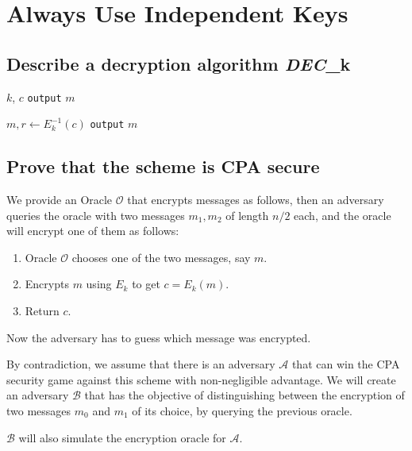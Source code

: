 \documentclass{article}
\begin{document}
\section{Always Use Independent Keys}
\subsection{Describe a decryption algorithm \textit{DEC}_k}

\begin{algorithm}
\caption{Decryption algorithm \textit{DEC}_k}
\begin{algorithmic}[H]
\Require $k$, $c$
\Ensure \texttt{output} $m$

\State $m, r \gets E_k^{-1}(c)$
\State \texttt{output} $m$
\end{algorithmic}
\end{algorithm}


\subsection{Prove that the scheme is CPA secure}
We provide an Oracle $\mathcal{O}$ that encrypts messages as follows, then an adversary queries the oracle with two messages $m_1, m_2$ of length $n/2$ each, and the oracle will encrypt one of them as follows:
\begin{enumerate}
    \item Oracle $\mathcal{O}$ chooses one of the two messages, say $m$.
    \item Encrypts $m$ using $E_k$ to get $c = E_k(m)$.
    \item Return $c$.
\end{enumerate}
Now the adversary has to guess which message was encrypted.

By contradiction, we assume that there is an adversary $\mathcal{A}$ that can win the CPA security game against this scheme with non-negligible advantage.
We will create an adversary $\mathcal{B}$ that has the objective of distinguishing between the encryption of two messages $m_0$ and $m_1$ of its choice, by querying the previous oracle.

$\mathcal{B}$ will also simulate the encryption oracle for $\mathcal{A}$.
\end{document}
